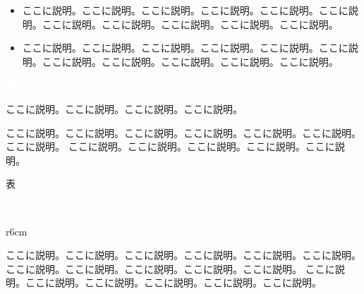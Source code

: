 \documentclass[a4paper, 14pt, dvipdfmx, fleqn]{jsarticle}
\begin{document}
    \begin{itemize}
        \setlength{\itemsep}{3mm}
        \item {\Large ここに説明。ここに説明。ここに説明。ここに説明。ここに説明。ここに説明。ここに説明。ここに説明。ここに説明。ここに説明。ここに説明。}
        \item {\Large ここに説明。ここに説明。ここに説明。ここに説明。ここに説明。ここに説明。ここに説明。ここに説明。ここに説明。ここに説明。ここに説明。}
    \end{itemize}

    \newpage

    \begin{tcolorbox}[
        colback=myBlue,
        colframe=myBlue,
        sharpish corners]
        {\huge \bf \textcolor{white}{梱包内容}}
    \end{tcolorbox}

    \noindent
    {\Large ここに説明。ここに説明。ここに説明。ここに説明。}

    \noindent
    {\Large ここに説明。ここに説明。ここに説明。ここに説明。ここに説明。ここに説明。ここに説明。
    ここに説明。ここに説明。ここに説明。ここに説明。ここに説明。}

    \vspace{1cm}

    \begin{tcolorbox}
        \vspace{10cm}
        \hfill {\Large 表} \hfill
        \vspace{10cm}
    \end{tcolorbox}

    \newpage

    \begin{tcolorbox}[
        colback=myBlue,
        colframe=myBlue,
        sharpish corners]
        {\huge \bf \textcolor{white}{ここにタイトル}}
    \end{tcolorbox}

    \begin{wrapfigure}[6]{r}{6cm}
        \centering
    \end{wrapfigure}

    \noindent
    {\Large \hspace{1em}ここに説明。ここに説明。ここに説明。ここに説明。ここに説明。ここに説明。ここに説明。ここに説明。ここに説明。ここに説明。ここに説明。
    ここに説明。ここに説明。ここに説明。ここに説明。ここに説明。ここに説明。}
\end{document}
